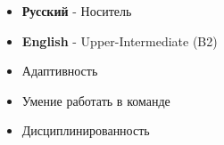 
\twocolumnsection
{
\vspace{1em}
\begin{itemize}
   \item{} {\textbf{Русский}} - Носитель
   \item{} {\textbf{English}} - Upper-Intermediate (B2)
\end{itemize}}
{
\vspace{1em}
\begin{itemize}
   \item Адаптивность
   \item Умение работать в команде
   \item Дисциплинированность
\end{itemize}}
